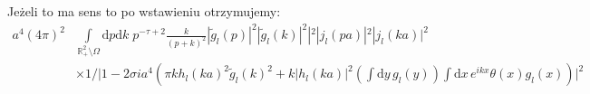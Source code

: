 \documentclass[a4paper,11pt]{article}
\newcommand{\de}{\mathrm{d}}
\newcommand{\T}{\mathcal{T}_{ l }}
\begin{document}
Jeżeli to ma sens to po wstawieniu otrzymujemy:
\begin{equation}
\begin{split}
a^{ 4 } ( 4 \pi )^{ 2 } & \int\limits_{ \mathbb{R}_{ + }^{ 2 } \setminus \Omega } \de p \de k \; p^{ -\tau + 2 } \frac{ k }{ ( p + k )^{ 2 } } | \widetilde{ g }_{ l }( p ) |^{ 2 } | \widetilde{ g }_{ l }( k ) |^{ 2 } |^{ 2 } | j_{ l }( pa ) |^{ 2 } | j_{ l }( ka ) |^{ 2 } \\
&\times 1/\Big| 1 - 2 \sigma i a^{ 4 } \left( \pi k h_{ l }( k a )^{ 2 } \widetilde{ g }_{ l }( k )^{ 2 } + k | h_{ l }( k a ) |^{ 2 } \left( \int \de y\, g_{ l }( y ) \right) \int \de x\, e^{ ikx } \theta( x ) g_{ l }( x ) \right) \Big|^{ 2 }
\end{split} 
\end{equation}
\end{document}
